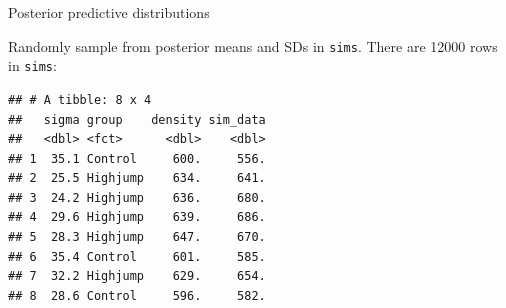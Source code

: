 \documentclass[
  ignorenonframetext,
]{beamer}
\newenvironment{Shaded}{\begin{snugshade}}{\end{snugshade}}
\newcommand{\DataTypeTok}[1]{\textcolor[rgb]{0.13,0.29,0.53}{#1}}
\newcommand{\DecValTok}[1]{\textcolor[rgb]{0.00,0.00,0.81}{#1}}
\newcommand{\KeywordTok}[1]{\textcolor[rgb]{0.13,0.29,0.53}{\textbf{#1}}}
\newcommand{\NormalTok}[1]{#1}
\newcommand{\OperatorTok}[1]{\textcolor[rgb]{0.81,0.36,0.00}{\textbf{#1}}}
\newcommand{\StringTok}[1]{\textcolor[rgb]{0.31,0.60,0.02}{#1}}
\begin{document}
\begin{frame}[fragile]{Posterior predictive distributions}
\protect\hypertarget{posterior-predictive-distributions}{}

Randomly sample from posterior means and SDs in \texttt{sims}. There are
12000 rows in \texttt{sims}:

\begin{Shaded}
\end{Shaded}

\begin{verbatim}
## # A tibble: 8 x 4
##   sigma group    density sim_data
##   <dbl> <fct>      <dbl>    <dbl>
## 1  35.1 Control     600.     556.
## 2  25.5 Highjump    634.     641.
## 3  24.2 Highjump    636.     680.
## 4  29.6 Highjump    639.     686.
## 5  28.3 Highjump    647.     670.
## 6  35.4 Control     601.     585.
## 7  32.2 Highjump    629.     654.
## 8  28.6 Control     596.     582.
\end{verbatim}

\end{frame}
\end{document}
